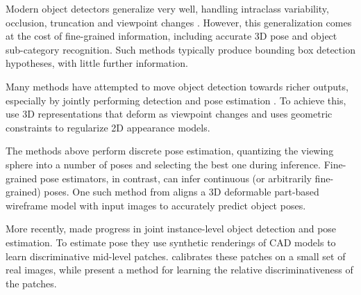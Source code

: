 %
Modern object detectors generalize very well, handling intraclass variability,
occlusion, truncation and viewpoint changes \cite{Felzenszwalb10, Girshick14}.
However, this generalization comes at the cost of fine-grained information,
including accurate 3D pose and object sub-category recognition. Such methods
typically produce bounding box detection hypotheses, with little further
information.

Many methods have attempted to move object detection towards richer outputs,
especially by jointly performing detection and pose estimation \cite{Pepik12,
Xiang12, Fidler12, Xiang14, Hejrati14, Aubry14, Lim14}. To achieve this,
\cite{Xiang12, Hejrati14, Fidler12} use 3D representations that deform as
viewpoint changes and \cite{Pepik12} uses geometric constraints to regularize 2D
appearance models.

The methods above perform discrete pose estimation, quantizing the viewing
sphere into a number of poses and selecting the best one during inference.
Fine-grained pose estimators, in contrast, can infer continuous (or arbitrarily
fine-grained) poses. One such method from \cite{Zia13} aligns a 3D deformable
part-based wireframe model with input images to accurately predict object poses.

More recently, \cite{Aubry14, Lim14} made progress in joint instance-level
object detection and pose estimation. To estimate pose they use synthetic
renderings of CAD models to learn discriminative mid-level patches.
\cite{Aubry14} calibrates these patches on a small set of real images, while
\cite{Lim14} present a method for learning the relative discriminativeness of
the patches.


